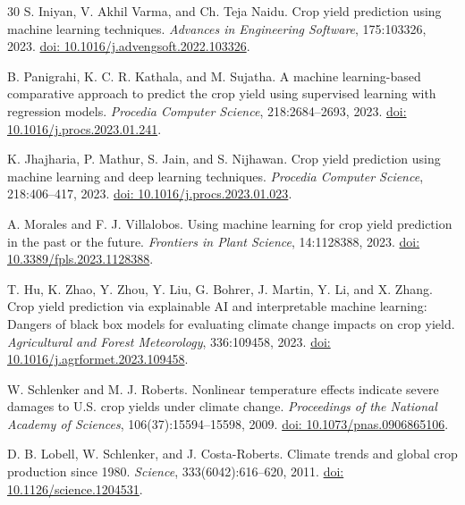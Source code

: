 \documentclass[11pt,a4paper]{article}
\begin{document}
\begin{thebibliography}{30}
S. Iniyan, V. Akhil Varma, and Ch. Teja Naidu.
\newblock Crop yield prediction using machine learning techniques.
\newblock \emph{Advances in Engineering Software}, 175:103326, 2023.
\newblock \href{https://doi.org/10.1016/j.advengsoft.2022.103326}{doi: 10.1016/j.advengsoft.2022.103326}.

B. Panigrahi, K. C. R. Kathala, and M. Sujatha.
\newblock A machine learning-based comparative approach to predict the crop yield using supervised learning with regression models.
\newblock \emph{Procedia Computer Science}, 218:2684--2693, 2023.
\newblock \href{https://doi.org/10.1016/j.procs.2023.01.241}{doi: 10.1016/j.procs.2023.01.241}.

K. Jhajharia, P. Mathur, S. Jain, and S. Nijhawan.
\newblock Crop yield prediction using machine learning and deep learning techniques.
\newblock \emph{Procedia Computer Science}, 218:406--417, 2023.
\newblock \href{https://doi.org/10.1016/j.procs.2023.01.023}{doi: 10.1016/j.procs.2023.01.023}.

A. Morales and F. J. Villalobos.
\newblock Using machine learning for crop yield prediction in the past or the future.
\newblock \emph{Frontiers in Plant Science}, 14:1128388, 2023.
\newblock \href{https://doi.org/10.3389/fpls.2023.1128388}{doi: 10.3389/fpls.2023.1128388}.

T. Hu, K. Zhao, Y. Zhou, Y. Liu, G. Bohrer, J. Martin, Y. Li, and X. Zhang.
\newblock Crop yield prediction via explainable AI and interpretable machine learning: Dangers of black box models for evaluating climate change impacts on crop yield.
\newblock \emph{Agricultural and Forest Meteorology}, 336:109458, 2023.
\newblock \href{https://doi.org/10.1016/j.agrformet.2023.109458}{doi: 10.1016/j.agrformet.2023.109458}.

W. Schlenker and M. J. Roberts.
\newblock Nonlinear temperature effects indicate severe damages to U.S. crop yields under climate change.
\newblock \emph{Proceedings of the National Academy of Sciences}, 106(37):15594--15598, 2009.
\newblock \href{https://doi.org/10.1073/pnas.0906865106}{doi: 10.1073/pnas.0906865106}.

D. B. Lobell, W. Schlenker, and J. Costa-Roberts.
\newblock Climate trends and global crop production since 1980.
\newblock \emph{Science}, 333(6042):616--620, 2011.
\newblock \href{https://doi.org/10.1126/science.1204531}{doi: 10.1126/science.1204531}.


\end{thebibliography}
\end{document}
